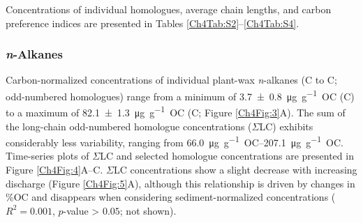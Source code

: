 Concentrations of individual homologues, average chain lengths, and carbon preference indices are presented in Tables \ref{Ch4Tab:S2}--\ref{Ch4Tab:S4}.

\subsubsection{\textit{n}-Alkanes}

Carbon-normalized concentrations of individual plant-wax \textit{n}-alkanes (C to C; odd-numbered homologues) range from a minimum of \SI{3.7 \pm 0.8}{\micro g.g^{-1}.OC} (C) to a maximum of \SI{82.1 \pm 1.3}{\micro g.g^{-1}.OC} (C; Figure \ref{Ch4Fig:3}A). The sum of the long-chain odd-numbered homologue concentrations ($\Sigma$LC) exhibits considerably less variability, ranging from \SIrange{66.0}{207.1}{\micro g.g^{-1}.OC}. Time-series plots of $\Sigma$LC and selected homologue concentrations are presented in Figure \ref{Ch4Fig:4}A--C. $\Sigma$LC concentrations show a slight decrease with increasing discharge (Figure \ref{Ch4Fig:5}A), although this relationship is driven by changes in \%OC and disappears when considering sediment-normalized concentrations ($R^2 = 0.001$, $p$-value > $0.05$; not shown).

